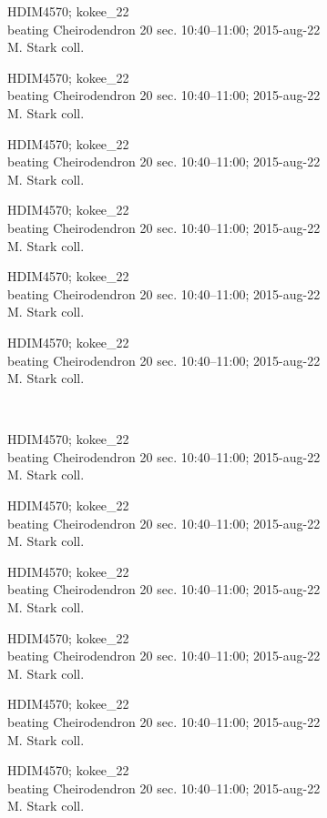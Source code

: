 \documentclass[2pt]{extarticle}
\begin{document}
\noindent
\parbox{0.16\textwidth}{\tiny \raggedright \rule[-0.3\baselineskip]{0pt}{10pt}HDIM4570; kokee\_22\\ beating Cheirodendron 20 sec. 10:40--11:00; 2015-aug-22\\ M. Stark coll.}
\parbox{0.16\textwidth}{\tiny \raggedright \rule[-0.3\baselineskip]{0pt}{10pt}HDIM4570; kokee\_22\\ beating Cheirodendron 20 sec. 10:40--11:00; 2015-aug-22\\ M. Stark coll.}
\parbox{0.16\textwidth}{\tiny \raggedright \rule[-0.3\baselineskip]{0pt}{10pt}HDIM4570; kokee\_22\\ beating Cheirodendron 20 sec. 10:40--11:00; 2015-aug-22\\ M. Stark coll.}
\parbox{0.16\textwidth}{\tiny \raggedright \rule[-0.3\baselineskip]{0pt}{10pt}HDIM4570; kokee\_22\\ beating Cheirodendron 20 sec. 10:40--11:00; 2015-aug-22\\ M. Stark coll.}
\parbox{0.16\textwidth}{\tiny \raggedright \rule[-0.3\baselineskip]{0pt}{10pt}HDIM4570; kokee\_22\\ beating Cheirodendron 20 sec. 10:40--11:00; 2015-aug-22\\ M. Stark coll.}
\parbox{0.16\textwidth}{\tiny \raggedright \rule[-0.3\baselineskip]{0pt}{10pt}HDIM4570; kokee\_22\\ beating Cheirodendron 20 sec. 10:40--11:00; 2015-aug-22\\ M. Stark coll.} \\ 
\vspace{0.001in} 

\noindent
\parbox{0.16\textwidth}{\tiny \raggedright \rule[-0.3\baselineskip]{0pt}{10pt}HDIM4570; kokee\_22\\ beating Cheirodendron 20 sec. 10:40--11:00; 2015-aug-22\\ M. Stark coll.}
\parbox{0.16\textwidth}{\tiny \raggedright \rule[-0.3\baselineskip]{0pt}{10pt}HDIM4570; kokee\_22\\ beating Cheirodendron 20 sec. 10:40--11:00; 2015-aug-22\\ M. Stark coll.}
\parbox{0.16\textwidth}{\tiny \raggedright \rule[-0.3\baselineskip]{0pt}{10pt}HDIM4570; kokee\_22\\ beating Cheirodendron 20 sec. 10:40--11:00; 2015-aug-22\\ M. Stark coll.}
\parbox{0.16\textwidth}{\tiny \raggedright \rule[-0.3\baselineskip]{0pt}{10pt}HDIM4570; kokee\_22\\ beating Cheirodendron 20 sec. 10:40--11:00; 2015-aug-22\\ M. Stark coll.}
\parbox{0.16\textwidth}{\tiny \raggedright \rule[-0.3\baselineskip]{0pt}{10pt}HDIM4570; kokee\_22\\ beating Cheirodendron 20 sec. 10:40--11:00; 2015-aug-22\\ M. Stark coll.}
\parbox{0.16\textwidth}{\tiny \raggedright \rule[-0.3\baselineskip]{0pt}{10pt}HDIM4570; kokee\_22\\ beating Cheirodendron 20 sec. 10:40--11:00; 2015-aug-22\\ M. Stark coll.} \\ 
\vspace{0.001in} 
\end{document}
